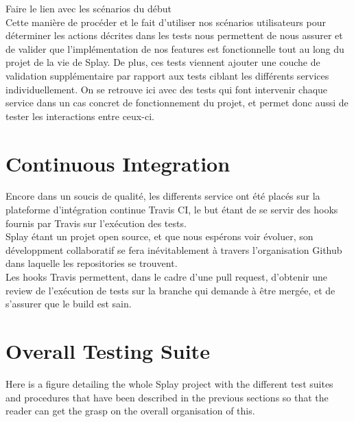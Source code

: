 \documentclass{eplmastersthesis}
\begin{document}
      {\color{red} Faire le lien avec les scénarios du début}\\

      Cette manière de procéder et le fait d'utiliser nos scénarios utilisateurs
      pour déterminer les actions décrites dans les tests nous permettent de
      nous assurer et de valider que l'implémentation de nos features est
      fonctionnelle tout au long du projet de la vie de Splay. De plus, ces
      tests viennent ajouter une couche de validation supplémentaire par rapport
      aux tests ciblant les différents services individuellement. On se retrouve
      ici avec des tests qui font intervenir chaque service dans un cas concret
      de fonctionnement du projet, et permet donc aussi de tester les interactions
      entre ceux-ci.


    \section{Continuous Integration}

      Encore dans un soucis de qualité, les differents service ont été placés
      sur la plateforme d'intégration continue Travis CI, le but étant de se
      servir des hooks fournis par Travis sur l'exécution des tests.\\

      Splay étant un projet open source, et que nous espérons voir évoluer, son
      développment collaboratif se fera inévitablement à travers l'organisation
      Github dans laquelle les repositories se trouvent.\\
      Les hooks Travis permettent, dans le cadre d'une pull request, d'obtenir
      une review de l'exécution de tests sur la branche qui demande à être
      mergée, et de s'assurer que le build est sain.

    \section{Overall Testing Suite}

      Here is a figure detailing the whole Splay project with the different
      test suites and procedures that have been described in the previous
      sections so that the reader can get the grasp on the overall
      organisation of this.
\end{document}
